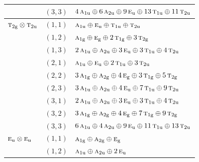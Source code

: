 \documentclass[11pt]{article}
\newcommand{\irr}[1]{\text{\normalfont\scshape #1}}
\newcommand{\ptag}[1]{\mathrm{#1}}
\begin{document}
\begin{longtable}{p{} c p{}}
 & $(3,3)$ & $4\,\irr{a}_{1\ptag{u}}\oplus 6\,\irr{a}_{2\ptag{u}}\oplus 9\,\irr{e}_{\ptag{u}}\oplus 13\,\irr{t}_{1\ptag{u}}\oplus 11\,\irr{t}_{2\ptag{u}}$\\

\hline

$\irr{t}_{2\ptag{g}}\otimes \irr{t}_{2\ptag{u}}$ & $(1,1)$ & $\irr{a}_{1\ptag{u}}\oplus \irr{e}_{\ptag{u}}\oplus \irr{t}_{1\ptag{u}}\oplus \irr{t}_{2\ptag{u}}$\\

 & $(1,2)$ & $\irr{a}_{1\ptag{g}}\oplus \irr{e}_{\ptag{g}}\oplus 2\,\irr{t}_{1\ptag{g}}\oplus 3\,\irr{t}_{2\ptag{g}}$\\

 & $(1,3)$ & $2\,\irr{a}_{1\ptag{u}}\oplus \irr{a}_{2\ptag{u}}\oplus 3\,\irr{e}_{\ptag{u}}\oplus 3\,\irr{t}_{1\ptag{u}}\oplus 4\,\irr{t}_{2\ptag{u}}$\\

 & $(2,1)$ & $\irr{a}_{1\ptag{u}}\oplus \irr{e}_{\ptag{u}}\oplus 2\,\irr{t}_{1\ptag{u}}\oplus 3\,\irr{t}_{2\ptag{u}}$\\

 & $(2,2)$ & $3\,\irr{a}_{1\ptag{g}}\oplus \irr{a}_{2\ptag{g}}\oplus 4\,\irr{e}_{\ptag{g}}\oplus 3\,\irr{t}_{1\ptag{g}}\oplus 5\,\irr{t}_{2\ptag{g}}$\\

 & $(2,3)$ & $3\,\irr{a}_{1\ptag{u}}\oplus \irr{a}_{2\ptag{u}}\oplus 4\,\irr{e}_{\ptag{u}}\oplus 7\,\irr{t}_{1\ptag{u}}\oplus 9\,\irr{t}_{2\ptag{u}}$\\

 & $(3,1)$ & $2\,\irr{a}_{1\ptag{u}}\oplus \irr{a}_{2\ptag{u}}\oplus 3\,\irr{e}_{\ptag{u}}\oplus 3\,\irr{t}_{1\ptag{u}}\oplus 4\,\irr{t}_{2\ptag{u}}$\\

 & $(3,2)$ & $3\,\irr{a}_{1\ptag{g}}\oplus \irr{a}_{2\ptag{g}}\oplus 4\,\irr{e}_{\ptag{g}}\oplus 7\,\irr{t}_{1\ptag{g}}\oplus 9\,\irr{t}_{2\ptag{g}}$\\

 & $(3,3)$ & $6\,\irr{a}_{1\ptag{u}}\oplus 4\,\irr{a}_{2\ptag{u}}\oplus 9\,\irr{e}_{\ptag{u}}\oplus 11\,\irr{t}_{1\ptag{u}}\oplus 13\,\irr{t}_{2\ptag{u}}$\\

\hline

$\irr{e}_{\ptag{u}}\otimes \irr{e}_{\ptag{u}}$ & $(1,1)$ & $\irr{a}_{1\ptag{g}}\oplus \irr{a}_{2\ptag{g}}\oplus \irr{e}_{\ptag{g}}$\\

 & $(1,2)$ & $\irr{a}_{1\ptag{u}}\oplus \irr{a}_{2\ptag{u}}\oplus 2\,\irr{e}_{\ptag{u}}$\\


\end{longtable}
\end{document}
